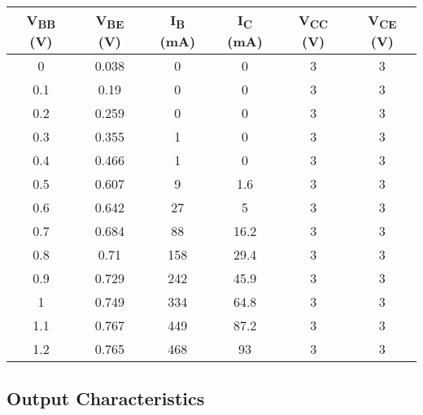 \documentclass{scrartcl}
\begin{document}
    \begin{table}[H]
        \centering
        \begin{tabular}{|c|c|c|c|c|c|}
        \hline
        \textbf{V\textsubscript{BB} (V)}  & \textbf{V\textsubscript{BE} (V)} &\textbf{I\textsubscript{B} (mA)} & \textbf{I\textsubscript{C} (mA)} & \textbf{V\textsubscript{CC} (V)} &  \textbf{V\textsubscript{CE} (V)}  \\
    \hline
        0     & 0.038 & 0            & 0            & 3     & 3             \\ \hline
        0.1   & 0.19  & 0            & 0            & 3     & 3             \\ \hline
        0.2   & 0.259 & 0            & 0            & 3     & 3             \\ \hline
        0.3   & 0.355 & 1            & 0            & 3     & 3             \\ \hline
        0.4   & 0.466 & 1            & 0            & 3     & 3             \\ \hline
        0.5   & 0.607 & 9            & 1.6          & 3     & 3             \\ \hline
        0.6   & 0.642 & 27           & 5            & 3     & 3             \\ \hline
        0.7   & 0.684 & 88           & 16.2         & 3     & 3             \\ \hline
        0.8   & 0.71  & 158          & 29.4         & 3     & 3             \\ \hline
        0.9   & 0.729 & 242          & 45.9         & 3     & 3             \\ \hline
        1     & 0.749 & 334          & 64.8         & 3     & 3             \\ \hline
        1.1   & 0.767 & 449          & 87.2         & 3     & 3             \\ \hline
        1.2   & 0.765 & 468          & 93           & 3     & 3             \\
        \hline           
        \end{tabular}
        \end{table}



\subsection{Output Characteristics}
\end{document}
